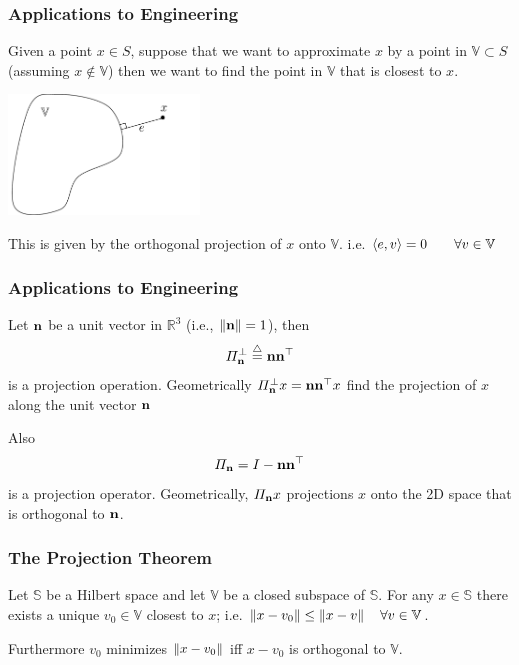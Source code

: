 \documentclass{beamer}
\begin{document}
\begin{frame}\frametitle{Applications to Engineering}
Given a point $x \in S$, suppose that we want to approximate $x$ by a
point in $\mathbb{V}\subset S$ (assuming $x \notin \mathbb{V}$) then
we want to find the point in $\mathbb{V}$ that is closest to $x$.\\

\begin{center}
\includegraphics[width=2in]{figures/chap2_projection_on_set}
\end{center}

This is given by the orthogonal projection of $x$ onto $\mathbb{V}$.  i.e. $\left< e,v\right> = 0 \qquad \forall v \in \mathbb{V}$

\end{frame}

\begin{frame}\frametitle{Applications to Engineering}
Let $\mathbf{n}$ be a unit vector in $\mathbb{R}^3$ (i.e., $\left\|\mathbf{n}\right\|=1$), then 
\[
\Pi_{\mathbf{n}}^\perp \stackrel{\triangle}{=} \mathbf{n} \mathbf{n}^\top
\]
is a projection operation.  Geometrically $\Pi_{\mathbf{n}}^\perp x = \mathbf{n} \mathbf{n}^\top x$ find the projection of $x$ along the unit vector $\mathbf{n}$

Also 
\[
\Pi_{\mathbf{n}} = I-\mathbf{n}\mathbf{n}^\top
\]
is a projection operator.  Geometrically, $\Pi_{\mathbf{n}} x$ projections $x$ onto the 2D space that is orthogonal to $\mathbf{n}$.

\end{frame}

\begin{frame}\frametitle{The Projection Theorem}
\begin{theorem}
Let $\mathbb{S}$ be a Hilbert space and let $\mathbb{V}$ be a closed subspace of $\mathbb{S}$.  For any $x \in \mathbb{S}$ there exists a unique $v_0 \in \mathbb{V}$ closest to $x$;  i.e. $\left\| x - v_0 \right\| \leq \left\| x - v \right\| \quad \forall v \in \mathbb{V}$.\\


\vspace{1cm}

Furthermore $v_0$ minimizes $\left\| x - v_0 \right\|$ iff $x - v_0$ is orthogonal to $\mathbb{V}$.	
\end{theorem}
	
\end{frame}
\end{document}
